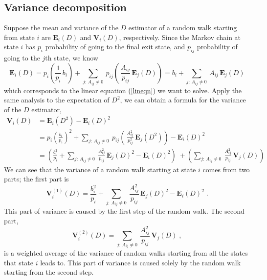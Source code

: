     \subsection{Variance decomposition}
        Suppose the mean and variance of the $D$ estimator of a random walk
        starting from state $i$ are $\mathbf{E}_i(D)$ and $\mathbf{V}_i(D)$,
        respectively. Since the Markov chain at state $i$ has $p_i$
        probability of going to the final exit state, and $p_{ij}$
        probability of going to the $j$th state, we know
        \[ \mathbf{E}_i(D) = p_i \left( \frac{1}{p_i}\, b_i\right) +
            \sum_{j:\,A_{ij}\ne0}\: p_{ij} \left(\,\frac{A_{ij}}{p_{ij}}\,
                                                 \mathbf{E}_j(D) \right)
            = b_i + \sum_{j:\,A_{ij}\ne0}\: A_{ij}\, \mathbf{E}_j(D)
        \]
        which corresponds to the linear equation (\ref{lineqn}) we want
        to solve. Apply the same analysis to the expectation of $D^2$,
        we can obtain a formula for the variance of the $D$ estimator,
        \begin{equation} \begin{split} \label{splittrans}
            \mathbf{V}_i(D)
            &= \mathbf{E}_i \left( D^2 \right) - \mathbf{E}_i(D)^2 \\
            &= p_i \left( \frac{b_i}{p_i}\right)^2
               + \sum_{j:\,A_{ij}\ne0}\: p_{ij}
               \left( \,\frac{A_{ij}^2}{p_{ij}^2}\, \mathbf{E}_j(D^2) \right)
               - \mathbf{E}_i(D)^2 \\
            &= \left( \frac{b_i^2}{p_i} + \sum_{j:\,A_{ij}\ne0}\:
                      \frac{A_{ij}^2}{p_{ij}}\, \mathbf{E}_j(D)^2 -
                      \mathbf{E}_i(D)^2 \right)  \;
               + \left( \sum_{j:\,A_{ij}\ne0}\: \frac{A_{ij}^2}{p_{ij}}\,
                        \mathbf{V}_j(D) \right)
        \end{split} \end{equation}
        We can see that the variance of a random walk starting at state $i$
        comes from two parts; the first part is
        \begin{equation} \label{part1trans}
            \mathbf{V}_i^{(1)}(D) = \frac{b_i^2}{p_i}
            + \sum_{j:\,A_{ij}\ne0}\:
            \frac{A_{ij}^2}{p_{ij}}\, \mathbf{E}_j(D)^2
            - \mathbf{E}_i(D)^2 \;.
        \end{equation}
        This part of variance is caused by the first step of the random walk.
        The second part,
        \begin{equation} \label{part2trans}
            \mathbf{V}_i^{(2)}(D) = \sum_{j:\,A_{ij}\ne0}\:
                \frac{A_{ij}^2}{p_{ij}}\, \mathbf{V}_j(D) \;,
        \end{equation}
        is a weighted average of the variance of random walks starting from
        all the states that state $i$ leads to.  This part of variance is
        caused solely by the random walk starting from the second step.
        
